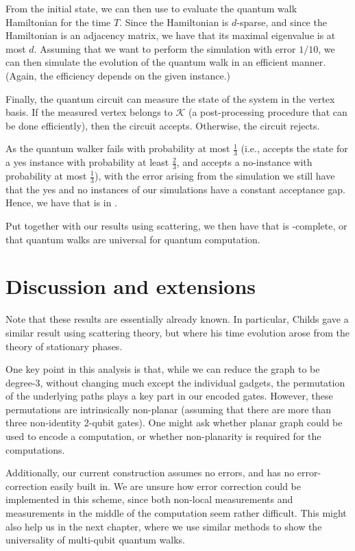 \documentclass[../thesis-main/thesis-main]{subfiles}
\begin{document}
From the initial state, we can then use  to evaluate the quantum walk Hamiltonian for the time $T$.  Since the Hamiltonian is $d$-sparse, and since the Hamiltonian is an adjacency matrix, we have that its maximal eigenvalue is at most $d$.  Assuming that we want to perform the simulation with error $1/10$, we can then simulate the evolution of the quantum walk in an efficient manner.  (Again, the efficiency depends on the given instance.)

Finally, the quantum circuit can measure the state of the system in the vertex basis.  If the measured vertex belongs to $\mathcal{K}$ (a post-processing procedure that can be done efficiently), then the circuit accepts.  Otherwise, the circuit rejects.

As the quantum walker fails with probability at most $\frac{1}{3}$ (i.e., accepts the state for a yes instance with probability at least $\frac{2}{3}$, and accepts a no-instance with probability at most $\frac{1}{3}$), with the error arising from the simulation we still have that the yes and no instances of our simulations have a constant acceptance gap.  Hence, we have that \QWE is in \BQP.

Put together with our results using scattering, we then have that \QWE is \BQP-complete, or that quantum walks are universal for quantum computation.


\section{Discussion and extensions}

Note that these results are essentially already known.  In particular, Childs gave a similar result using scattering theory, but where his time evolution arose from the theory of stationary phases. 

One key point in this analysis is that, while we can reduce the graph to be degree-3, without changing much except the individual gadgets, the permutation of the underlying paths plays a key part in our encoded gates.  However, these permutations are intrinsically non-planar (assuming that there are more than three non-identity 2-qubit gates).  One might ask whether  planar graph could be used to encode a computation, or whether non-planarity is required for the computations.

Additionally, our current construction assumes no errors, and has no error-correction easily built in.  We are unsure how error correction could be implemented in this scheme, since both non-local measurements and measurements in the middle of the computation seem rather difficult.  This might also help us in the next chapter, where we use similar methods to show the universality of multi-qubit quantum walks.


\biblio
\end{document}
